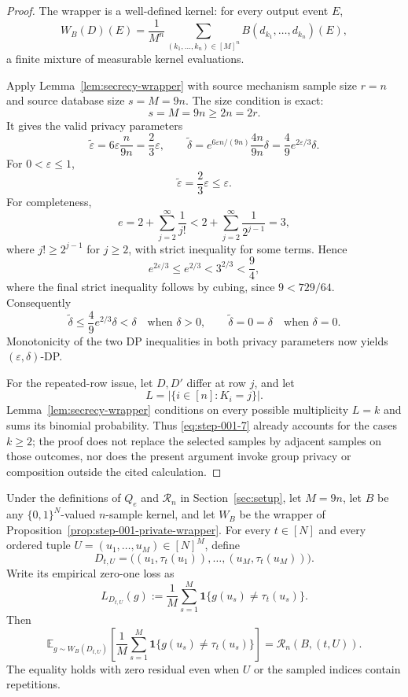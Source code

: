 \begin{proof}

The wrapper is a well-defined kernel: for every output event \(E\),
\[
W_B(D)(E)=\frac1{M^n}
\sum_{(k_1,\ldots,k_n)\in[M]^n}
B(d_{k_1},\ldots,d_{k_n})(E),
\tag{5}\label{eq:step-001-5}
\]
a finite mixture of measurable kernel evaluations.

Apply Lemma~\ref{lem:secrecy-wrapper} with source mechanism sample size \(r=n\) and source database size \(s=M=9n\). The size condition is exact:
\[
s=M=9n\ge2n=2r.
\tag{6}\label{eq:step-001-6}
\]
It gives the valid privacy parameters
\[
\widetilde\varepsilon
=6\varepsilon\frac n{9n}=\frac23\varepsilon,
\qquad
\widetilde\delta
=e^{6\varepsilon n/(9n)}\frac{4n}{9n}\delta
=\frac49e^{2\varepsilon/3}\delta.
\tag{7}\label{eq:step-001-7}
\]
For \(0<\varepsilon\le 1\),
\[
\widetilde\varepsilon=\frac23\varepsilon\le\varepsilon.
\tag{8}\label{eq:step-001-8}
\]
For completeness,
\[
e=2+\sum_{j=2}^{\infty}\frac1{j!}
<2+\sum_{j=2}^{\infty}\frac1{2^{j-1}}=3,
\tag{9a}\label{eq:step-001-9a}
\]
where \(j!\ge 2^{j-1}\) for \(j\ge 2\), with strict inequality for some terms. Hence
\[
e^{2\varepsilon/3}\le e^{2/3}<3^{2/3}<\frac94,
\]
where the final strict inequality follows by cubing, since \(9<729/64\). Consequently
\[
\widetilde\delta
\le\frac49 e^{2/3}\delta
<\delta
\quad\text{when }\delta>0,
\qquad
\widetilde\delta=0=\delta
\quad\text{when }\delta=0.
\tag{9}\label{eq:step-001-9}
\]
Monotonicity of the two DP inequalities in both privacy parameters now yields \((\varepsilon,\delta)\)-DP.

For the repeated-row issue, let \(D,D'\) differ at row \(j\), and let
\[
L=|\{i\in[n]:K_i=j\}|.
\]
Lemma~\ref{lem:secrecy-wrapper} conditions on every possible multiplicity \(L=k\) and sums its binomial probability. Thus \eqref{eq:step-001-7} already accounts for the cases \(k\ge 2\); the proof does not replace the selected samples by adjacent samples on those outcomes, nor does the present argument invoke group privacy or composition outside the cited calculation.

\end{proof}


\begin{lemma}
\label{lem:step-001-risk-identity}

Under the definitions of \(Q_e\) and \(\mathcal R_n\) in Section~\ref{sec:setup}, let \(M=9n\), let \(B\) be any \(\{0,1\}^N\)-valued \(n\)-sample kernel, and let \(W_B\) be the wrapper of Proposition~\ref{prop:step-001-private-wrapper}. For every \(t \in [N]\) and every ordered tuple \(U=(u_1,\ldots,u_M) \in [N]^M\), define
\[
D_{t,U}=\bigl((u_1,\tau_t(u_1)),\ldots,
(u_M,\tau_t(u_M))\bigr).
\tag{10}\label{eq:step-001-10}
\]
Write its empirical zero-one loss as
\[
L_{D_{t,U}}(g)
:=\frac1M\sum_{s=1}^M
\mathbf 1\{g(u_s)\ne\tau_t(u_s)\}.
\tag{10a}\label{eq:step-001-10a}
\]
Then
\[
\mathbb E_{g\sim W_B(D_{t,U})}
\left[\frac1M\sum_{s=1}^M
\mathbf 1\{g(u_s)\ne\tau_t(u_s)\}\right]
=\mathcal R_n(B,(t,U)).
\tag{11}\label{eq:step-001-11}
\]
The equality holds with zero residual even when \(U\) or the sampled indices contain repetitions.

\end{lemma}


